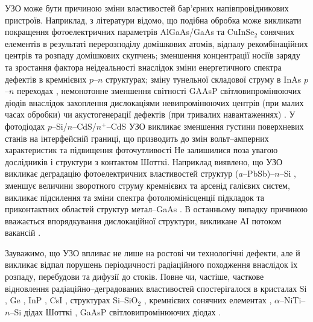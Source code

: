 УЗО може бути причиною зміни властивостей бар'єрних напівпровідникових пристроїв.
Наприклад, з літератури відомо, що подібна обробка може викликати покращення фотоелектричних параметрів AlGaAs/GaAs \cite{Zaver2005} та CuInSe$_2$ \cite{OstapSC} сонячних елементів в результаті перерозподілу домішкових атомів, відпалу рекомбінаційних центрів та розпаду домішкових скупчень;
зменшення концентрації носіїв заряду \cite{Davletova2008}
та зростання фактора неідеальності \cite{Davletova2009}
внаслідок зміни енергетичного спектра дефектів в кремнієвих $p$--$n$ структурах;
зміну тунельної складової струму в InAs $p$--$n$ переходах \cite{Teterkin2009r},
немонотонне зменшення світності GAAsP світловипромінюючих діодів внаслідок захоплення дислокаціями невипромінюючих центрів (при малих часах обробки) чи акустогенерації дефектів (при тривалих навантаженнях) \cite{US:LED}.
У фотодіодах $p$--Si/$n$--CdS/$n^+$--CdS УЗО викликає зменшення густини поверхневих станів на інтерфейсній границі,
що призводить до змін вольт--амперних характеристик та підвищення фоточутливості \cite{Mirsagatov,Mirsagatov2}
Не залишилися поза увагою дослідників і структури з контактом Шотткі.
Наприклад виявлено, що УЗО викликає деградацію фотоелектричних властивостей структур ($a$--PbSb)--$n$--Si \cite{Pashaev2012r,PashOJA},
зменшує величини зворотного струму кремнієвих \cite{Tagaev} та арсенід галієвих \cite{UST:SDErmol} систем,
викликає підсилення та зміни спектра фотолюмінісценції підкладок та приконтактних областей структур метал--GaAs \cite{UST:SDErmol}.
В останньому випадку причиною вважається впорядкування дислокаційної структури, викликане АІ потоком вакансій \cite{UST:SDErmol}.

Зауважимо, що УЗО впливає не лише на ростові чи технологічні дефекти, але й викликає відпал порушень періодичності радіаційного походження внаслідок їх розпаду, перебудови та дифузії до стоків.
Повне чи, частіше, часткове відновлення радіаційно--деградованих властивостей спостерігалося
в кристалах Si  \cite{OstrovRadSi,Podolian2012r,PodolHivr,YOlikh2006TPLr}, Ge \cite{Olikh:FTP1996},
InP \cite{OlikhProc}, CsI \cite{UST:OstrovCsI}, структурах Si--SiO$_2$ \cite{Parchinskii2000r,Parchinskii2006r},
кремнієвих сонячних елементах \cite{YOlikh2007TPLr},
$\alpha$--NiTi--$n$--Si дідах Шотткі \cite{Pashaev2014r},
GaAsP світловипромінюючих діодах \cite{US:LED,UST:LED_SM}.



